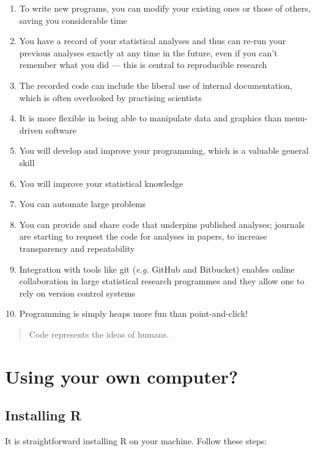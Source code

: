 \documentclass[
]{book}
\begin{document}
\begin{enumerate}
\def\labelenumi{\arabic{enumi}.}
\item
  To write new programs, you can modify your existing ones or those of others, saving you considerable time
\item
  You have a record of your statistical analyses and thus can re-run your previous analyses exactly at any time in the future, even if you can't remember what you did --- this is central to reproducible research
\item
  The recorded code can include the liberal use of internal documentation, which is often overlooked by practising scientists
\item
  It is more flexible in being able to manipulate data and graphics than menu-driven software
\item
  You will develop and improve your programming, which is a valuable general skill
\item
  You will improve your statistical knowledge
\item
  You can automate large problems
\item
  You can provide and share code that underpins published analyses; journals are starting to request the code for analyses in papers, to increase transparency and repeatability
\item
  Integration with tools like git (\emph{e.g.} GitHub and Bitbucket) enables online collaboration in large statistical research programmes and they allow one to rely on version control systems
\item
  Programming is simply heaps more fun than point-and-click!
\end{enumerate}

\begin{quote}
Code represents the ideas of humans.
\end{quote}

\hypertarget{using-your-own-computer}{%
\section{Using your own computer?}\label{using-your-own-computer}}

\hypertarget{installing-r}{%
\subsection{Installing R}\label{installing-r}}

It is straightforward installing R on your machine. Follow these steps:
\end{document}
